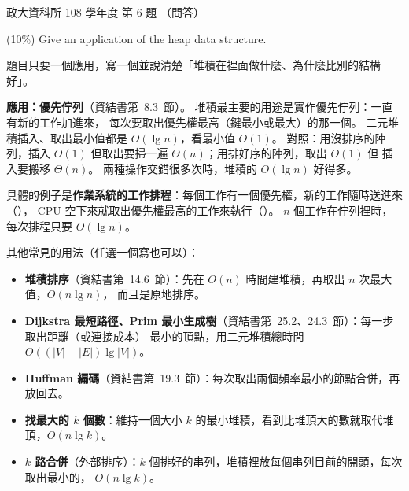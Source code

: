 \begin{pastexam}[label={px:nccu-108-dsa-06}]{政大資科所 108 學年度 第 6 題}
（問答）

(10\%) Give an application of the heap data structure.
\end{pastexam}

\begin{pastsoln}
題目只要一個應用，寫一個並說清楚「堆積在裡面做什麼、為什麼比別的結構好」。

\textbf{應用：優先佇列}（資結書第~8.3~節）。 堆積最主要的用途是實作優先佇列：一直有新的工作加進來，
每次要取出優先權最高（鍵最小或最大）的那一個。 二元堆積插入、取出最小值都是 $O(\lg n)$，看最小值
$O(1)$。 對照：用沒排序的陣列，插入 $O(1)$ 但取出要掃一遍 $\Theta(n)$；用排好序的陣列，取出 $O(1)$ 但
插入要搬移 $\Theta(n)$。 兩種操作交錯很多次時，堆積的 $O(\lg n)$ 好得多。

具體的例子是\textbf{作業系統的工作排程}：每個工作有一個優先權，新的工作隨時送進來（），
CPU 空下來就取出優先權最高的工作來執行（）。 $n$ 個工作在佇列裡時，每次排程只要
$O(\lg n)$。

其他常見的用法（任選一個寫也可以）：
\begin{itemize}
\item \textbf{堆積排序}（資結書第~14.6~節）：先在 $O(n)$ 時間建堆積，再取出 $n$ 次最大值，$O(n \lg n)$，
而且是原地排序。
\item \textbf{Dijkstra 最短路徑、Prim 最小生成樹}（資結書第~25.2、24.3~節）：每一步取出距離（或連接成本）
最小的頂點，用二元堆積總時間 $O((|V| + |E|) \lg |V|)$。
\item \textbf{Huffman 編碼}（資結書第~19.3~節）：每次取出兩個頻率最小的節點合併，再放回去。
\item \textbf{找最大的 $k$ 個數}：維持一個大小 $k$ 的最小堆積，看到比堆頂大的數就取代堆頂，$O(n \lg k)$。
\item \textbf{$k$ 路合併}（外部排序）：$k$ 個排好的串列，堆積裡放每個串列目前的開頭，每次取出最小的，
$O(n \lg k)$。
\end{itemize}
\end{pastsoln}
